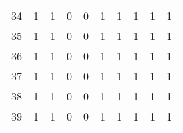 \begin{longtable}{lrrrrrrrrr}
34    &                          1 &                             1 &                          0 &                        0 &                           1 &                        1 &                         1 &                            1 &                         1 \\
35    &                          1 &                             1 &                          0 &                        0 &                           1 &                        1 &                         1 &                            1 &                         1 \\
36    &                          1 &                             1 &                          0 &                        0 &                           1 &                        1 &                         1 &                            1 &                         1 \\
37    &                          1 &                             1 &                          0 &                        0 &                           1 &                        1 &                         1 &                            1 &                         1 \\
38    &                          1 &                             1 &                          0 &                        0 &                           1 &                        1 &                         1 &                            1 &                         1 \\
39    &                          1 &                             1 &                          0 &                        0 &                           1 &                        1 &                         1 &                            1 &                         1 \\
\end{longtable}

